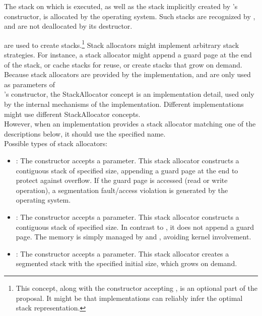 The stack on which  is executed, as well as the stack implicitly
created by 's constructor, is allocated by the operating
system. Such stacks are recognized by \ectx, and are not deallocated by its
destructor.

\label{subsec:stackalloc}
are used to create stacks.\footnote{This concept, along with the \ectx
constructor accepting , is an optional part of the
proposal. It might be that implementations can reliably infer the optimal
stack representation.} Stack allocators might implement arbitrary stack
strategies. For instance, a stack allocator might append a guard page at the
end of the stack, or cache stacks for reuse, or create stacks that grow on
demand.\\
Because stack allocators are provided by the implementation, and are only used
as parameters of\\
\ectx's constructor, the StackAllocator concept is an implementation detail,
used only by the internal mechanisms of the \ectx implementation. Different
implementations might use different StackAllocator concepts.\\
However, when an implementation provides a stack allocator matching one of
the descriptions below, it should use the specified name.\\
Possible types of stack allocators:
\begin{itemize}
    \item {}: The constructor accepts a 
        parameter. This stack allocator constructs a contiguous stack of
        specified size, appending a guard page at the end to protect against
        overflow. If the guard page is accessed (read or write operation), a
        segmentation fault/access violation is generated by the operating
        system.
    \item {}: The constructor accepts a  parameter.
        This stack allocator constructs a contiguous stack of specified size.
        In contrast to , it does not append a guard
        page. The memory is simply managed by 
        and , avoiding kernel involvement.
    \item {}: The constructor accepts a  parameter.
        This stack allocator creates a segmented stack with the specified
        initial size, which grows on demand.
\end{itemize}

